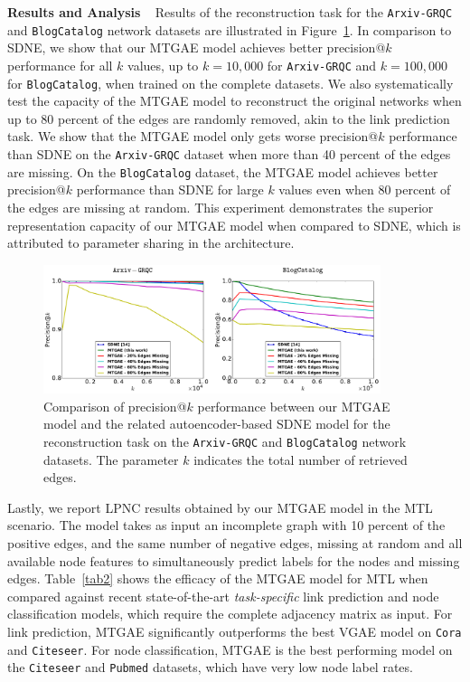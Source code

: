 \documentclass{article}
\begin{document}
\noindent \textbf{Results and Analysis} ~ Results of the reconstruction task for the \texttt{Arxiv-GRQC} and \texttt{BlogCatalog} network datasets are illustrated in Figure~\ref{fig2}. In comparison to SDNE, we show that our MTGAE model achieves better precision@$k$ performance for all $k$ values, up to $k=10,000$ for \texttt{Arxiv-GRQC} and $k=100,000$ for \texttt{BlogCatalog}, when trained on the complete datasets. We also systematically test the capacity of the MTGAE model to reconstruct the original networks when up to 80 percent of the edges are randomly removed, akin to the link prediction task. We show that the MTGAE model only gets worse precision@$k$ performance than SDNE on the \texttt{Arxiv-GRQC} dataset when more than 40 percent of the edges are missing. On the \texttt{BlogCatalog} dataset, the MTGAE model achieves better precision@$k$ performance than SDNE for large $k$ values even when 80 percent of the edges are missing at random. This experiment demonstrates the superior representation capacity of our MTGAE model when compared to SDNE, which is attributed to parameter sharing in the architecture.

\begin{figure}[hb]
\centering
\includegraphics[width=0.88\textwidth]{precisionK_figure.pdf}
\centering
\caption{Comparison of precision@$k$ performance between our MTGAE model and the related autoencoder-based SDNE model for the reconstruction task on the \texttt{Arxiv-GRQC} and \texttt{BlogCatalog} network datasets. The parameter $k$ indicates the total number of retrieved edges.}
\label{fig2}
\end{figure}

Lastly, we report LPNC results obtained by our MTGAE model in the MTL scenario. The model takes as input an incomplete graph with 10 percent of the positive edges, and the same number of negative edges, missing at random and all available node features to simultaneously predict labels for the nodes and missing edges. Table~\ref{tab2} shows the efficacy of the MTGAE model for MTL when compared against recent state-of-the-art \emph{task-specific} link prediction and node classification models, which require the complete adjacency matrix as input. For link prediction, MTGAE significantly outperforms the best VGAE model on \texttt{Cora} and \texttt{Citeseer}. For node classification, MTGAE is the best performing model on the \texttt{Citeseer} and \texttt{Pubmed} datasets, which have very low node label rates.
\end{document}
